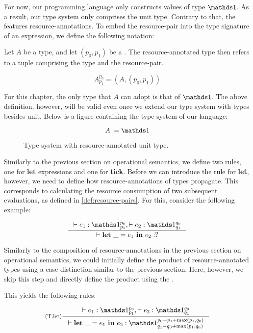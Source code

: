 For now, our programming language only constructs values of type \(\unit\). As a result, our type system only comprises the unit type. Contrary to that, the  features resource-annotations. To embed the resource-pair into the type signature of an expression, we define the following notation:

\begin{definition}\label{def:ra-type}
   Let \(A\) be a type, and let \((p_0, p_1)\) be a . The resource-annotated type then refers to a tuple comprising the type and the resource-pair.

   \[A^{p_0}_{p_1} = (A, (p_0, p_1))\] 

\end{definition}

For this chapter, the only type that \(A\) can adopt is that of \(\unit\). The above definition, however, will be valid even once we extend our type system with types besides unit. Below is a figure containing the type system of our language:

\begin{figure}[h] \label{fig:type-system}
   \[A := \unit \]
   \caption{Type system with resource-annotated unit type.}
\end{figure}

Similarly to the previous section on operational semantics, we define two rules, one for \textbf{let} expressions and one for \textbf{tick}. Before we can introduce the rule for \textbf{let}, however, we need to define how resource-annotations of types propagate. This corresponds to calculating the resource consumption of two subsequent evaluations, as defined in \cref{def:resource-pairs}. For this, consider the following example:

\[
   \inference[]
   {\typing{}{e_1}{\ratype{\unit}{p_0}{p_1}}, \typing{}{e_2}{\ratype{\unit}{q_0}{q_1}}}
   {\typing{}{\letexp{\_}{e_1}{e_2}}{?}}
\]

Similarly to the composition of resource-annotations in the previous section on operational semantics, we could initially define the product of resource-annotated types using a case distinction similar to the previous section. Here, however, we skip this step and directly define the product using the .

This yields the following rules:

\[
   \label{def:tr-let-4}
   \inference[(T:let)]
   {\typing{}{e_1}{\ratype{\unit}{p_0}{p_1}},  \typing{}{e_2}{\ratype{\unit}{q_0}{q_1}}}
   {\typing{}{\letexp{\_}{e_1}{e_2}}{\ratype{\unit}{p_0 - p_1 + \max(p_1, q_0)}{q_1 - q_0 + \max(p_1, q_0)}}}
\]


